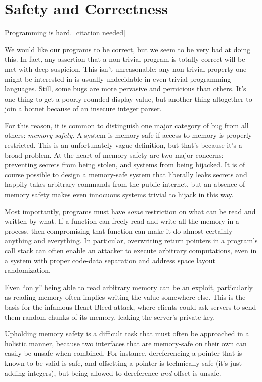 \chapter{Safety and Correctness}
\label{ch:problems}

Programming is hard. [citation needed]

We would like our programs to be correct, but we seem to be very bad at doing
this. In fact, any assertion that a non-trivial program is totally correct
will be met with deep suspicion. This isn't unreasonable: any non-trivial property
one might be interested in is usually undecidable in even trivial programming
languages. Still, some bugs are more pervasive and pernicious than others.
It's one thing to get a poorly rounded display value, but another thing altogether
to join a botnet because of an insecure integer parser.

For this reason, it is common to distinguish one major category of bug from
all others: \emph{memory safety}. A system is memory-safe if access to memory is
properly restricted. This is an unfortunately vague definition, but that's because
it's a broad problem. At the heart of memory safety are two major concerns:
preventing secrets from being stolen, and systems from being hijacked. It is
of course possible to design a memory-safe system that liberally leaks secrets
and happily takes arbitrary commands from the public internet, but an absence
of memory safety makes even innocuous systems trivial to hijack in this way.

Most importantly, programs must have \emph{some} restriction on what can be read
and written by what. If a function can freely read and write all the memory
in a process, then compromising that function can make it do almost certainly
anything and everything. In particular, overwriting return pointers in a
program's call stack can often enable an attacker to execute arbitrary
computations, even in a system with proper code-data separation and address
space layout randomization.

Even ``only'' being able to read arbitrary memory can be an exploit, particularly
as reading memory often implies writing the value somewhere else. This is the
basis for the infamous Heart Bleed attack, where clients could ask servers
to send them random chunks of its memory, leaking the server's private key.

Upholding memory safety is a difficult task that must often be approached in
a holistic manner, because two interfaces that are memory-safe on their own can easily
be unsafe when combined. For instance, dereferencing a pointer that is known
to be valid is safe, and offsetting a pointer is technically safe (it's just adding integers),
but being allowed to dereference \emph{and} offset is unsafe.

